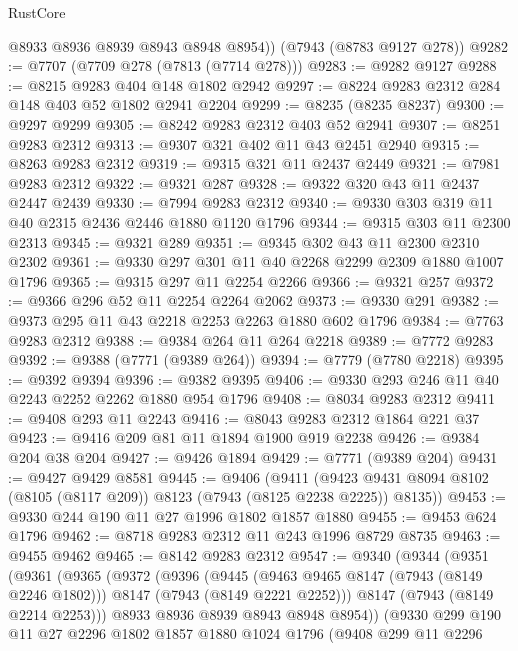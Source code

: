 \begin{lexlean}{RustCore}
\begin{coremodule}
        @8933
        @8936
        @8939
        @8943
        @8948
        @8954))
    (@7943 (@8783 @9127 @278))
@9282 := @7707 (@7709 @278 (@7813 (@7714 @278)))
@9283 := @9282 @9127
@9288 := @8215 @9283 @404 @148 @1802 @2942
@9297 := @8224 @9283 @2312 @284 @148 @403 @52 @1802 @2941 @2204
@9299 := @8235 (@8235 @8237)
@9300 := @9297 @9299
@9305 := @8242 @9283 @2312 @403 @52 @2941
@9307 := @8251 @9283 @2312
@9313 := @9307 @321 @402 @11 @43 @2451 @2940
@9315 := @8263 @9283 @2312
@9319 := @9315 @321 @11 @2437 @2449
@9321 := @7981 @9283 @2312
@9322 := @9321 @287
@9328 := @9322 @320 @43 @11 @2437 @2447 @2439
@9330 := @7994 @9283 @2312
@9340 := @9330 @303 @319 @11 @40 @2315 @2436 @2446 @1880 @1120 @1796
@9344 := @9315 @303 @11 @2300 @2313
@9345 := @9321 @289
@9351 := @9345 @302 @43 @11 @2300 @2310 @2302
@9361 := @9330 @297 @301 @11 @40 @2268 @2299 @2309 @1880 @1007 @1796
@9365 := @9315 @297 @11 @2254 @2266
@9366 := @9321 @257
@9372 := @9366 @296 @52 @11 @2254 @2264 @2062
@9373 := @9330 @291
@9382 := @9373 @295 @11 @43 @2218 @2253 @2263 @1880 @602 @1796
@9384 := @7763 @9283 @2312
@9388 := @9384 @264 @11 @264 @2218
@9389 := @7772 @9283
@9392 := @9388 (@7771 (@9389 @264))
@9394 := @7779 (@7780 @2218)
@9395 := @9392 @9394
@9396 := @9382 @9395
@9406 := @9330 @293 @246 @11 @40 @2243 @2252 @2262 @1880 @954 @1796
@9408 := @8034 @9283 @2312
@9411 := @9408 @293 @11 @2243
@9416 := @8043 @9283 @2312 @1864 @221 @37
@9423 := @9416 @209 @81 @11 @1894 @1900 @919 @2238
@9426 := @9384 @204 @38 @204
@9427 := @9426 @1894
@9429 := @7771 (@9389 @204)
@9431 := @9427 @9429 @8581
@9445 := @9406
    (@9411 (@9423 @9431 @8094 @8102 (@8105 (@8117 @209)) @8123 (@7943 (@8125 @2238 @2225)) @8135))
@9453 := @9330 @244 @190 @11 @27 @1996 @1802 @1857 @1880
@9455 := @9453 @624 @1796
@9462 := @8718 @9283 @2312 @11 @243 @1996 @8729 @8735
@9463 := @9455 @9462
@9465 := @8142 @9283 @2312
@9547 := @9340
    (@9344
      (@9351
        (@9361
          (@9365
            (@9372
              (@9396
                (@9445
                  (@9463 @9465 @8147 (@7943 (@8149 @2246 @1802)))
                  @8147
                  (@7943 (@8149 @2221 @2252)))
                @8147
                (@7943 (@8149 @2214 @2253)))
              @8933
              @8936
              @8939
              @8943
              @8948
              @8954))
          (@9330
            @299
            @190
            @11
            @27
            @2296
            @1802
            @1857
            @1880
            @1024
            @1796
            (@9408
              @299
              @11
              @2296

\end{coremodule}
\end{lexlean}
